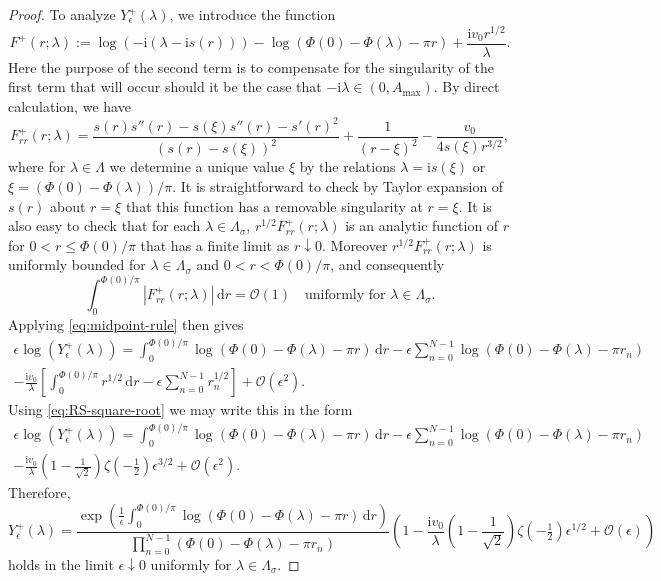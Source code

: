 \documentclass[12pt]{amsart}
\numberwithin{equation}{section}
\newcommand{\dd}{\mathrm{d}}
\newcommand{\ii}{\mathrm{i}}
\newcommand{\SP}{\lambda}
\newcommand{\phaseint}{\Phi}
\newcommand{\rr}{r}
\newcommand{\bigo}[1]{ \mathcal{O}\! \left( #1 \right) }
\begin{document}
\begin{proof}
To analyze $Y_\epsilon^+(\SP)$, we introduce the function
\begin{equation}
F^+(\rr;\SP):=\log(-\ii (\SP-\ii s(\rr)))-\log(\phaseint(0)-\phaseint(\SP)-\pi \rr)+\frac{\ii v_0\rr^{1/2}}{\SP}.
\end{equation}
Here the purpose of the second term is to compensate for the singularity of the first term that will occur should it be the case that $-\ii\SP\in (0,A_\mathrm{max})$.  By direct calculation, we have
\begin{equation}
F^+_{\rr\rr}(\rr;\SP)=\frac{s(\rr)s''(\rr)-s(\xi)s''(\rr)-s'(\rr)^2}{(s(\rr)-s(\xi))^2}+\frac{1}{(\rr-\xi)^2}-\frac{v_0}{4s(\xi)\rr^{3/2}},
\label{eq:F-plus-tt}
\end{equation}
where for $\SP\in\Lambda$ we determine a unique value $\xi$ by the relations $\SP=\ii s(\xi)$ or $\xi=(\phaseint(0)-\phaseint(\SP))/\pi$.  It is straightforward to check by Taylor expansion of $s(\rr)$ about $\rr=\xi$ that this function has a removable singularity at $\rr=\xi$.  It is also easy to check that for each $\SP\in\Lambda_\sigma$, $\rr^{1/2}F_{\rr\rr}^+(\rr;\SP)$ is an analytic function of $\rr$ for $0<\rr\le \phaseint(0)/\pi$ that has a finite 
limit as $\rr\downarrow 0$.  
Moreover $\rr^{1/2}F_{\rr\rr}^+(\rr;\SP)$ is uniformly bounded for $\SP\in\Lambda_\sigma$ and $0<\rr<\phaseint(0)/\pi$, and consequently
\begin{equation}
\int_0^{\phaseint(0)/\pi}|F_{\rr\rr}^+(\rr;\SP)|\,\dd \rr = \bigo{1}\quad\text{uniformly for $\SP\in \Lambda_\sigma$}.
\end{equation}
Applying \eqref{eq:midpoint-rule} then gives
\begin{multline}
\epsilon\log (Y_\epsilon^+(\SP))=\int_0^{\phaseint(0)/\pi}\log(\phaseint(0)-\phaseint(\SP)-\pi \rr)\,\dd \rr - 
\epsilon\sum_{n=0}^{N-1}\log(\phaseint(0)-\phaseint(\SP)-\pi \rr_n) \\
- \frac{\ii v_0}{\SP}\left[\int_0^{\phaseint(0)/\pi}\rr^{1/2}\,\dd \rr - \epsilon\sum_{n=0}^{N-1}\rr_n^{1/2}\right]
+\bigo{\epsilon^2}.
\end{multline}
Using \eqref{eq:RS-square-root} we may write this in the form
\begin{multline}
\epsilon\log (Y_\epsilon^+(\SP))=\int_0^{\phaseint(0)/\pi}\log(\phaseint(0)-\phaseint(\SP)-\pi \rr)\,\dd \rr - 
\epsilon\sum_{n=0}^{N-1}\log(\phaseint(0)-\phaseint(\SP)-\pi \rr_n) \\
-\frac{\ii v_0}{\SP}\left(1-\frac{1}{\sqrt{2}}\right)\zeta(-\tfrac{1}{2})\epsilon^{3/2} + \bigo{\epsilon^2}.
\end{multline}
Therefore, 
\begin{equation}
Y_\epsilon^+(\SP)=\frac{\displaystyle\exp\left(\frac{1}{\epsilon}\int_0^{\phaseint(0)/\pi}\log(\phaseint(0)-\phaseint(\SP)-\pi \rr)\,\dd \rr\right)}{\displaystyle \prod_{n=0}^{N-1}(\phaseint(0)-\phaseint(\SP)-\pi \rr_n)} 
\left(1-\frac{\ii v_0}{\SP}\left(1-\frac{1}{\sqrt{2}}\right)\zeta(-\tfrac{1}{2})\epsilon^{1/2}+\bigo{\epsilon}\right)
\label{eq:Y-plus-formula}
\end{equation}
holds in the limit $\epsilon\downarrow 0$ uniformly for $\SP\in\Lambda_\sigma$.  


\end{proof}
\end{document}
